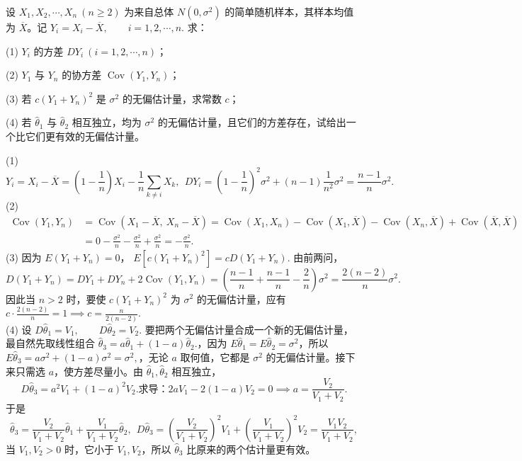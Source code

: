 \documentclass[lang=cn,11pt]{elegantbook}
\begin{document}
\begin{exercise}\label{exer:src-2011-a-06-34credit}
设 \(X_1,X_2,\cdots,X_n\ (n\ge2)\) 为来自总体 \(N(0,\sigma^2)\) 的简单随机样本，其样本均值为 \(\overline X\)。记
\(
Y_i=X_i-\overline X,\qquad i=1,2,\cdots,n.
\)
求：\par
(1) \(Y_i\) 的方差 \(DY_i\ (i=1,2,\cdots,n)\)；\par
(2) \(Y_1\) 与 \(Y_n\) 的协方差 \(\operatorname{Cov}(Y_1,Y_n)\)；\par
(3) 若 \(c(Y_1+Y_n)^2\) 是 \(\sigma^2\) 的无偏估计量，求常数 \(c\)；\par
(4) 若 \(\hat\theta_1\) 与 \(\hat\theta_2\) 相互独立，均为 \(\sigma^2\) 的无偏估计量，且它们的方差存在，试给出一个比它们更有效的无偏估计量。
\end{exercise}
\begin{solution}
(1) 
\[
Y_i=X_i-\overline X
=\left(1-\frac1n\right)X_i-\frac1n\sum_{k\ne i}X_k,~~
DY_i=\left(1-\frac1n\right)^2\sigma^2+(n-1)\frac1{n^2}\sigma^2
=\frac{n-1}{n}\sigma^2.
\]
(2)
\begin{align*}
\operatorname{Cov}(Y_1,Y_n)&=\operatorname{Cov}(X_1-\overline X,\ X_n-\overline X)=\operatorname{Cov}(X_1,X_n)-\operatorname{Cov}(X_1,\overline X)-\operatorname{Cov}(X_n,\overline X)+\operatorname{Cov}(\overline X,\overline X)\\
&=0-\frac{\sigma^2}{n}-\frac{\sigma^2}{n}+\frac{\sigma^2}{n}=-\frac{\sigma^2}{n}.
\end{align*}
(3) 因为 \(E(Y_1+Y_n)=0\)，
\(
E\!\left[c(Y_1+Y_n)^2\right]
=cD(Y_1+Y_n).
\)
由前两问，
\[
D(Y_1+Y_n)
=DY_1+DY_n+2\operatorname{Cov}(Y_1,Y_n)
=\left(\frac{n-1}{n}+\frac{n-1}{n}-\frac2n\right)\sigma^2
=\frac{2(n-2)}{n}\sigma^2.
\]
因此当 \(n>2\) 时，要使 \(c(Y_1+Y_n)^2\) 为 \(\sigma^2\) 的无偏估计量，应有
\(
c\cdot\frac{2(n-2)}{n}=1\implies
c=\frac{n}{2(n-2)}.
\)\\
(4) 设
\(
D\hat\theta_1=V_1,\qquad D\hat\theta_2=V_2.
\)
要把两个无偏估计量合成一个新的无偏估计量，最自然先取线性组合
\(
\hat\theta_3=a\hat\theta_1+(1-a)\hat\theta_2.
\)，因为 \(E\hat\theta_1=E\hat\theta_2=\sigma^2\)，所以
\(
E\hat\theta_3=a\sigma^2+(1-a)\sigma^2=\sigma^2,
\)，无论 \(a\) 取何值，它都是 \(\sigma^2\) 的无偏估计量。接下来只需选 \(a\)，使方差尽量小。由 \(\hat\theta_1,\hat\theta_2\) 相互独立，
\[
D\hat\theta_3=a^2V_1+(1-a)^2V_2.\text{求导：}
2aV_1-2(1-a)V_2=0
\implies a=\frac{V_2}{V_1+V_2}.
\]
于是
\[
\hat\theta_3=\frac{V_2}{V_1+V_2}\hat\theta_1+\frac{V_1}{V_1+V_2}\hat\theta_2,~~
D\hat\theta_3
=\left(\frac{V_2}{V_1+V_2}\right)^2V_1
+\left(\frac{V_1}{V_1+V_2}\right)^2V_2
=\frac{V_1V_2}{V_1+V_2},
\]
当 \(V_1,V_2>0\) 时，它小于 \(V_1,V_2\)，所以 \(\hat\theta_3\) 比原来的两个估计量更有效。
\end{solution}
\end{document}

